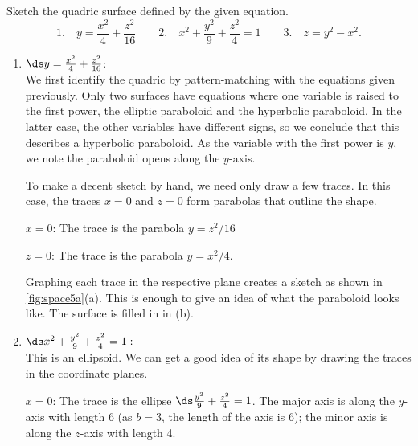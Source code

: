 \begin{example}\label{ex_space5}
Sketch the quadric surface defined by the given equation.
\[
 \text{1.}\quad y=\frac{x^2}{4}+\frac{z^2}{16}\qquad
 \text{2.}\quad x^2+\frac{y^2}{9}+\frac{z^2}{4}=1\qquad
 \text{3.}\quad z=y^2-x^2.
\]
\solution
\begin{enumerate}
	\item $\ds y=\frac{x^2}{4}+\frac{z^2}{16}$:\\
	We first identify the quadric by pattern-matching with the equations given previously. Only two surfaces have equations where one variable is raised to the first power, the elliptic paraboloid and the hyperbolic paraboloid. In the latter case, the other variables have different signs, so we conclude that this describes a hyperbolic paraboloid. As the variable with the first power is $y$, we note the paraboloid opens along the $y$-axis. 
	
	To make a decent sketch by hand, we need only draw a few traces. In this case, the traces $x=0$ and $z=0$ form parabolas that outline the shape.
	
	$x=0$:	The trace is the parabola $y=z^2/16$
	
	$z=0$: 	The trace is the parabola $y=x^2/4$.
	
	Graphing each trace in the respective plane creates a sketch as shown in \autoref{fig:space5a}(a). This is enough to give an idea of what the paraboloid looks like. The surface is filled in in (b).
	
	\item		$\ds x^2+\frac{y^2}{9}+\frac{z^2}{4}=1:$\\
	This is an ellipsoid. We can get a good idea of its shape by drawing the traces in the coordinate planes.
	
	$x=0$: 	The trace is the ellipse $\ds\frac{y^2}{9}+\frac{z^2}{4}=1$. The major axis is along the $y$-axis with length 6 (as $b=3$, the length of the axis is 6); the minor axis is along the $z$-axis with length 4.
	

\end{enumerate}
\end{example}
